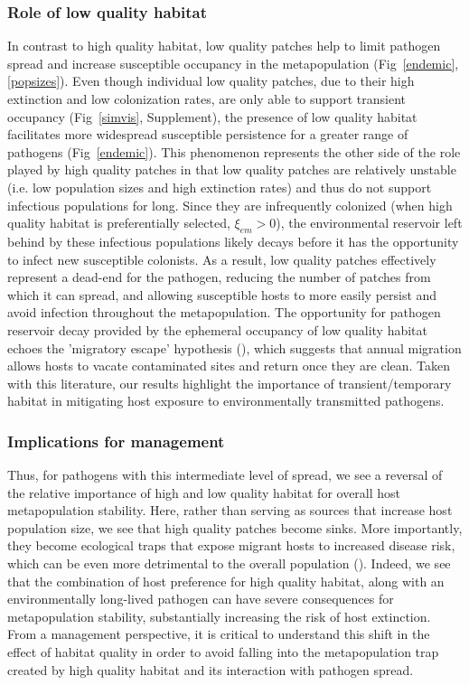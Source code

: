 \documentclass{article}
\begin{document}
\subsubsection*{Role of low quality habitat}
In contrast to high quality habitat, low quality patches help to limit pathogen spread and increase susceptible occupancy in the metapopulation (Fig~\ref{endemic}, \ref{popsizes}). 
Even though individual low quality patches, due to their high extinction and low colonization rates, are only able to support transient occupancy (Fig~\ref{simvis}, Supplement), the presence of low quality habitat facilitates more widespread susceptible persistence for a greater range of pathogens (Fig~\ref{endemic}).  
This phenomenon represents the other side of the role played by high quality patches in that low quality patches are relatively unstable (i.e. low population sizes and high extinction rates) and thus do not support infectious populations for long.
Since they are infrequently colonized (when high quality habitat is preferentially selected, $\xi_{em} > 0$), the environmental reservoir left behind by these infectious populations likely decays before it has the opportunity to infect new susceptible colonists. 
As a result, low quality patches effectively represent a dead-end for the pathogen, reducing the number of patches from which it can spread, and allowing susceptible hosts to more easily persist and avoid infection throughout the metapopulation.
The opportunity for pathogen reservoir decay provided by the ephemeral occupancy of low quality habitat echoes the 'migratory escape' hypothesis (\cite{Loehle1995}), which suggests that annual migration allows hosts to vacate contaminated sites and return once they are clean.
Taken with this literature, our results highlight the importance of transient/temporary habitat in mitigating host exposure to environmentally transmitted pathogens.

\subsubsection*{Implications for management}

Thus, for pathogens with this intermediate level of spread, we see a reversal of the relative importance of high and low quality habitat for overall host metapopulation stability.
Here, rather than serving as sources that increase host population size, we see that high quality patches become sinks.  
More importantly, they become ecological traps that expose migrant hosts to increased disease risk, which can be even more detrimental to the overall population (\cite{Kristan2003}).  
Indeed, we see that the combination of host preference for high quality habitat, along with an environmentally long-lived pathogen can have severe consequences for metapopulation stability, substantially increasing the risk of host extinction.
From a management perspective, it is critical to understand this shift in the effect of habitat quality in order to avoid falling into the metapopulation trap created by high quality habitat and its interaction with pathogen spread.
\end{document}
